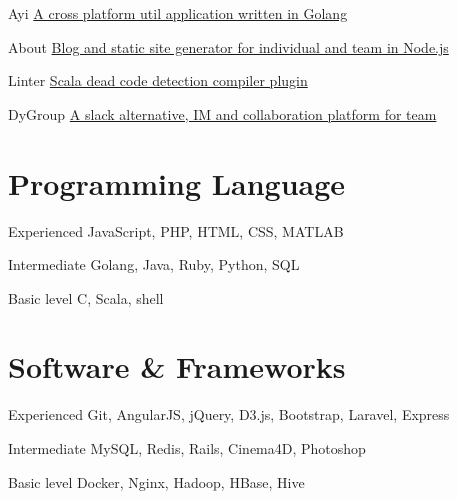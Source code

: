\documentclass[fontsize=10pt]{tccv}
\begin{document}
\begin{factlist}

\item{Ayi}
     {\href{https://github.com/dyweb/Ayi}{A cross platform util application written in Golang}}

\item{About}
    {\href{https://github.com/tongquhq/about}{Blog and static site generator for individual and team in Node.js}}

\item{Linter}
    {\href{https://github.com/at15/scala-linter}{Scala dead code detection compiler plugin}}

\item{DyGroup}
    {\href{https://coding.net/u/arrowrowe/p/dyGroup/git}{A slack alternative, IM and collaboration platform for team}}

\end{factlist}

%

\section{Programming Language}

\begin{factlist}

\item{Experienced}
     {JavaScript, PHP, HTML, CSS, MATLAB}

\item{Intermediate}
     {Golang, Java, Ruby, Python, SQL}

\item{Basic level}
     {C, Scala, shell}

\end{factlist}

\section{Software \& Frameworks}

\begin{factlist}

\item{Experienced}
     {Git, AngularJS, jQuery, D3.js, Bootstrap, Laravel, Express}

\item{Intermediate}
     {MySQL, Redis, Rails, Cinema4D, Photoshop}

\item{Basic level}
     {Docker, Nginx, Hadoop, HBase, Hive}

\end{factlist}

\end{document}
